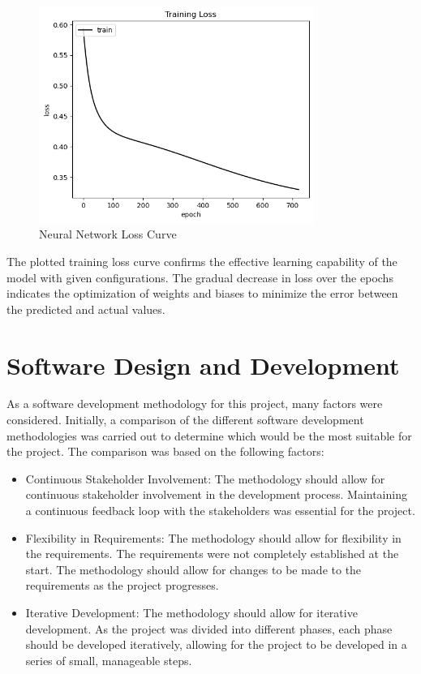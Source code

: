 \begin{figure}[H]
    \centering
    \includegraphics[width=0.8\textwidth]{images/nnCharts/neural_network_loss_curve.png}
    \caption{Neural Network Loss Curve}
    \label{fig:neural_network_loss_curve}
\end{figure}


The plotted training loss curve confirms the effective learning capability of the model with given configurations. The gradual decrease in loss over the epochs indicates the optimization 
of weights and biases to minimize the error between the predicted and actual values.











\section{Software Design and Development}

As a software development methodology for this project, many factors were considered. Initially, a comparison of the different software development methodologies was carried out to determine
which would be the most suitable for the project. The comparison was based on the following factors:

\begin{itemize}
    \item Continuous Stakeholder Involvement: The methodology should allow for continuous stakeholder involvement in the development process. Maintaining a continuous feedback loop with the 
    stakeholders was essential for the project. 
    \item Flexibility in Requirements: The methodology should allow for flexibility in the requirements. The requirements were not completely established at the start. The methodology should allow for changes to be made to the requirements as the project progresses.
    \item Iterative Development: The methodology should allow for iterative development. As the project was divided into different phases, each phase should be developed iteratively, allowing for the project to be developed in a series of small, manageable steps.    
\end{itemize}

